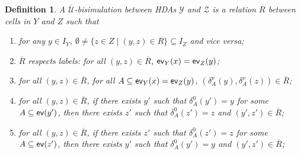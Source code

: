 \documentclass[11pt,a4paper,oldfontcommands]{memoir}
\newcommand*\ev{\textup{\textsf{ev}}}
\newcommand{\TrO}{\mathbf{T}}
\newtheorem{definition}{Definition}
\newtheorem{proposition}[definition]{Proposition}
\begin{document}
\begin{definition}\label{def: U bar bis}
     A \emph{$\overline{\mathcal{U}}$-bisimulation} between HDAs $\mathcal{Y}$ and $\mathcal{Z}$ is a relation $\overline{R}$ between cells in $Y$ and $Z$ such that
\begin{enumerate}
\item \label{en: U bar bisim.e1} for any $ y\in I_Y $, $\emptyset \neq \{z \in Z \mid (y,z) \in R \} \subseteq I_Z$ and vice versa;
\item \label{en: U bar bisim.e3} $\overline{R}$ respects labels: for all
  $( y, z)\in \overline{R}$, $\ev_Y( x)= \ev_Z(y)$;
\item \label{en: U bar bisim.e4} for all $( y, z)\in \overline{R}$, for all $A \subseteq \ev_Y(x)= \ev_Z(y)$, $( \delta^{\nu}_A(y),
 \delta^{\nu}_A(z))\in \overline{R}$; %
\item \label{en: U bar bisim.e5} for all $( y, z)\in \overline{R}$, if there exists $y'$ such that $\delta^{0}_A(y')=y$ for some $A\subseteq \ev(y')$, then there exists $z'$ such that $\delta^{0}_A(z')=z$ and $( y', z') \in \overline{R}$; %

\item \label{en: U bar bisim.e6} for all $( y, z)\in \overline{R}$, if there exists $z'$ such that $\delta^{0}_A(z')=z$ for some $A\subseteq \ev(z')$, then there exists $y'$ such that $\delta^{0}_A(y')=y$ and $( y', z') \in \overline{R}$; %
\end{enumerate}
\end{definition}
\end{document}
